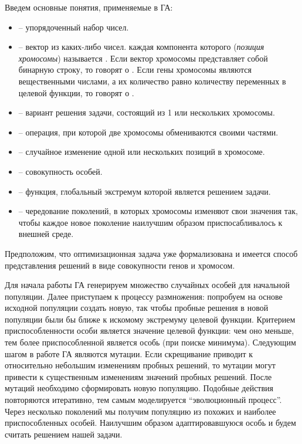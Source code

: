 Введем основные понятия, применяемые в ГА:
\begin{itemize}
	\item {} -- упорядоченный набор чисел.
	\item {} -- вектор из каких-либо чисел. каждая компонента которого (\textit{позиция хромосомы}) называется . Если вектор хромосомы представляет собой бинарную строку, то говорят о . Если гены хромосомы являются вещественными числами, а их количество равно количеству переменных в целевой функции, то говорят о . \cite{mathGA}
	\item {} -- вариант решения задачи, состоящий из 1 или нескольких хромосомы.
	\item {} -- операция, при которой две хромосомы обмениваются своими частями.
	\item {} -- случайное изменение одной или нескольких позиций в хромосоме.
	\item {} -- совокупность особей.
	\item {} -- функция, глобальный экстремум которой является решением задачи.
	\item {} -- чередование поколений, в которых хромосомы изменяют свои значения так, чтобы каждое новое поколение наилучшим образом приспосабливалось к внешней среде.
\end{itemize}

Предположим, что оптимизационная задача уже формализована и имеется способ представления решений в виде совокупности генов и хромосом.

Для начала работы ГА генерируем множество случайных особей для начальной популяции. Далее приступаем к процессу размножения: попробуем на основе исходной популяции создать новую, так чтобы пробные решения в новой популяции были бы ближе к искомому экстремуму целевой функции. Критерием приспособленности особи является значение целевой функции: чем оно меньше, тем более приспособленной является особь (при поиске минимума). Следующим шагом в работе ГА являются мутации. Если скрещивание приводит к относительно небольшим изменениям пробных решений, то мутации могут привести к существенным изменениям значений пробных решений. После мутаций необходимо сформировать новую популяцию. Подобные действия повторяются итеративно, тем самым моделируется ``эволюционный процесс''. Через несколько поколений мы получим популяцию из похожих и наиболее приспособленных особей. Наилучшим образом адаптировавшуюся особь и будем считать решением нашей задачи.

